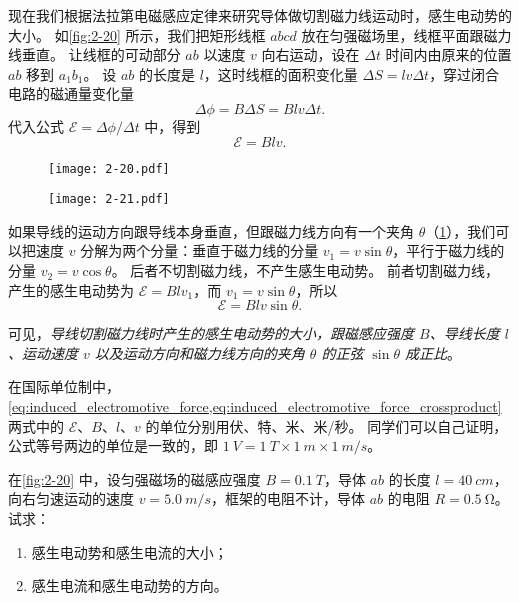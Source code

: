 现在我们根据法拉第电磁感应定律来研究导体做切割磁力线运动时，感生电动势的大小。
如\cref{fig:2-20} 所示，我们把矩形线框 $abcd$ 放在匀强磁场里，线框平面跟磁力线垂直。
让线框的可动部分 $ab$ 以速度 $v$ 向右运动，设在 $\Delta t$ 时间内由原来的位置 $ab$ 移到 $a_1b_1$。 
设 $ab$ 的长度是 $l$，这时线框的面积变化量 $\Delta S=l v\Delta t$，穿过闭合电路的磁通量变化量
\[\Delta \phi=B\Delta S=Bl v\Delta t.\]
代入公式 $\mathcal{E}=\Delta \phi/\Delta t$ 中，得到
\begin{equation}
  \label{eq:induced_electromotive_force}
  \mathcal{E}=Bl v.
\end{equation}
\begin{figure}
\begin{minipage}[b]{0.48\linewidth}\centering
  \texttt{[image: 2-20.pdf]}
  \caption{}\label{fig:2-20}
\end{minipage}
\begin{minipage}[b]{0.48\linewidth}\centering
  \texttt{[image: 2-21.pdf]}
  \caption{}\label{fig:2-21}
\end{minipage}
\end{figure}

如果导线的运动方向跟导线本身垂直，但跟磁力线方向有一个夹角 $\theta$（\cref{fig:2-21}），我们可以把速度 $v$ 分解为两个分量：垂直于磁力线的分量 $v_1=v\sin\theta$，平行于磁力线的分量 $v_2=v\cos\theta$。
后者不切割磁力线，不产生感生电动势。
前者切割磁力线，产生的感生电动势为 $\mathcal{E}=Bl v_1$，而 $v_1=v\sin\theta$，所以
\begin{equation}
  \label{eq:induced_electromotive_force_crossproduct}
  \mathcal{E}=Bl v\sin\theta.
\end{equation}

可见，\emph{导线切割磁力线时产生的感生电动势的大小，跟磁感应强度 $B$、导线长度 $l$、运动速度 $v$ 以及运动方向和磁力线方向的夹角 $\theta$ 的正弦 $\sin\theta$ 成正比}。

在国际单位制中，\cref{eq:induced_electromotive_force,eq:induced_electromotive_force_crossproduct} 两式中的 $\mathcal{E}$、$B$、$l$、$v$ 的单位分别用伏、特、米、米/秒。
同学们可以自己证明，公式等号两边的单位是一致的，即 $\qty{1}{V}=\qty{1}{T}\times \qty{1}{m}\times\qty{1}{m/s}$。

\begin{example}
  在\cref{fig:2-20} 中，设匀强磁场的磁感应强度 $B=\qty{0.1}{T}$，导体 $ab$ 的长度 $l=\qty{40}{cm}$，向右匀速运动的速度 $v=\qty{5.0}{m/s}$，框架的电阻不计，导体 $ab$ 的电阻 $R=\qty{0.5}{\ohm}$。试求：
  \begin{enumerate}
    \item 感生电动势和感生电流的大小；
    \item 感生电流和感生电动势的方向。
  \end{enumerate}
\end{example}

